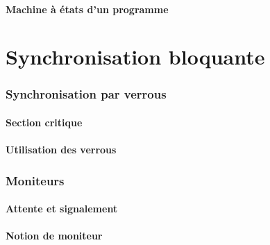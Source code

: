 \documentclass[9pt, handout]{beamer}
\begin{document}
\subsection{Machine à états d'un programme}



 
 
\part{Synchronisation bloquante}
 
 
\section{Synchronisation par verrous}
 
\subsection{Section critique}







 
\subsection{Utilisation des verrous}









 
\section{Moniteurs}
 
\subsection{Attente et signalement}



 
\subsection{Notion de moniteur}




 
\end{document}
